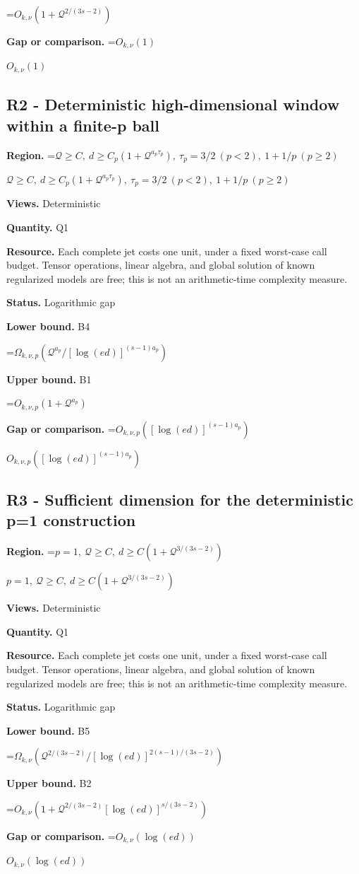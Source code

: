 \documentclass[10pt,a4paper]{article}
\newcommand{\AtlasMath}[1]{\par\begingroup\centering\setbox0=\hbox{$\displaystyle #1$}\ifdim\wd0>1.4\linewidth\typeout{ATLAS WIDE FORMULA: \the\wd0}\fi\ifdim\wd0>\linewidth\resizebox{\linewidth}{!}{\box0}\else\box0\fi\par\endgroup}
\newcommand{\AtlasInlineMath}[1]{\begingroup\setbox0=\hbox{$#1$}\ifdim\wd0>.4\linewidth\endgroup\AtlasMath{#1}\else\endgroup$#1$\fi}
\begin{document}
\AtlasMath{O_{k,\nu}(1+\mathcal{Q}^{2/(3s-2)})}
\textbf{Gap or comparison.} \AtlasInlineMath{O_{k,\nu}(1)}

\subsection{R2 - Deterministic high-dimensional window within a finite-p ball}
\textbf{Region.} \AtlasInlineMath{\mathcal{Q}\ge C,\ d\ge C_p(1+\mathcal{Q}^{a_p\tau_p}),\ \tau_p=3/2\ (p<2),\ 1+1/p\ (p\ge2)}

\textbf{Views.} Deterministic

\textbf{Quantity.} Q1

\textbf{Resource.} Each complete jet costs one unit, under a fixed worst-case call budget. Tensor operations, linear algebra, and global solution of known regularized models are free; this is not an arithmetic-time complexity measure.

\textbf{Status.} Logarithmic gap

\textbf{Lower bound.} B4

\AtlasMath{\Omega_{k,\nu,p}(\mathcal{Q}^{a_p}/[\log(ed)]^{(s-1)a_p})}
\textbf{Upper bound.} B1

\AtlasMath{O_{k,\nu,p}(1+\mathcal{Q}^{a_p})}
\textbf{Gap or comparison.} \AtlasInlineMath{O_{k,\nu,p}([\log(ed)]^{(s-1)a_p})}

\subsection{R3 - Sufficient dimension for the deterministic p=1 construction}
\textbf{Region.} \AtlasInlineMath{p=1,\ \mathcal{Q}\ge C,\ d\ge C(1+\mathcal{Q}^{3/(3s-2)})}

\textbf{Views.} Deterministic

\textbf{Quantity.} Q1

\textbf{Resource.} Each complete jet costs one unit, under a fixed worst-case call budget. Tensor operations, linear algebra, and global solution of known regularized models are free; this is not an arithmetic-time complexity measure.

\textbf{Status.} Logarithmic gap

\textbf{Lower bound.} B5

\AtlasMath{\Omega_{k,\nu}(\mathcal{Q}^{2/(3s-2)}/[\log(ed)]^{2(s-1)/(3s-2)})}
\textbf{Upper bound.} B2

\AtlasMath{O_{k,\nu}(1+\mathcal{Q}^{2/(3s-2)}[\log(ed)]^{s/(3s-2)})}
\textbf{Gap or comparison.} \AtlasInlineMath{O_{k,\nu}(\log(ed))}
\end{document}
